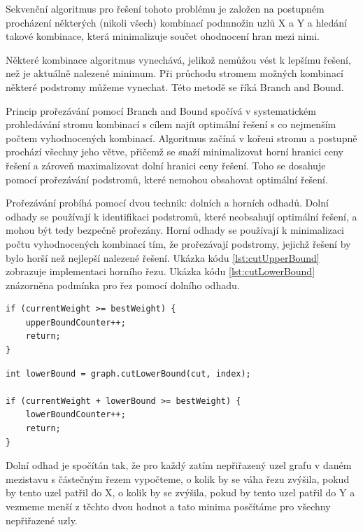 \documentclass[epsf,epic,eepic,eepicemu]{article}\oddsidemargin=-5mm
\begin{document}
Sekvenční algoritmus pro řešení tohoto problému je založen na postupném procházení některých (nikoli všech) kombinací podmnožin uzlů X a Y a hledání takové kombinace, která minimalizuje součet ohodnocení hran mezi nimi. 

Některé kombinace algoritmus vynechává, jelikož nemůžou vést k lepšímu řešení, než je aktuálně nalezené minimum. Při průchodu stromem možných kombinací některé podstromy můžeme vynechat. Této metodě se říká Branch and Bound.

Princip prořezávání pomocí Branch and Bound spočívá v systematickém prohledávání stromu kombinací s cílem najít optimální řešení s co nejmenším počtem vyhodnocených kombinací. Algoritmus začíná v kořeni stromu a postupně prochází všechny jeho větve, přičemž se snaží minimalizovat horní hranici ceny řešení a zároveň maximalizovat dolní hranici ceny řešení. Toho se dosahuje pomocí prořezávání podstromů, které nemohou obsahovat optimální řešení.

Prořezávání probíhá pomocí dvou technik: dolních a horních odhadů. Dolní odhady se používají k identifikaci podstromů, které neobsahují optimální řešení, a mohou být tedy bezpečně prořezány. Horní odhady se používají k minimalizaci počtu vyhodnocených kombinací tím, že prořezávají podstromy, jejichž řešení by bylo horší než nejlepší nalezené řešení. Ukázka kódu \ref{lst:cutUpperBound} zobrazuje implementaci horního řezu. Ukázka kódu \ref{lst:cutLowerBound} znázorněna podmínka pro řez pomocí dolního odhadu.

\begin{lstlisting}[float,label=lst:cutUpperBound, caption={Horní řez}]
if (currentWeight >= bestWeight) {
    upperBoundCounter++;
    return;
}
\end{lstlisting}

\begin{lstlisting}[float,label=lst:cutLowerBound, caption={Dolní řez}]
int lowerBound = graph.cutLowerBound(cut, index);

if (currentWeight + lowerBound >= bestWeight) {
    lowerBoundCounter++;
    return;
}
\end{lstlisting}

Dolní odhad je spočítán tak, že pro každý zatím nepřiřazený uzel grafu v daném mezistavu s částečným řezem vypočteme, o kolik by se váha řezu zvýšila, pokud by tento uzel patřil do X, o kolik by se zvýšila, pokud by tento uzel patřil do Y a vezmeme menší z těchto dvou hodnot a tato minima posčítáme pro všechny nepřiřazené uzly.
\end{document}
